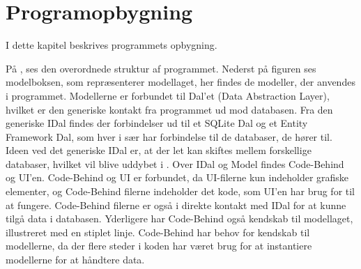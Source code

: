 \chapter{Programopbygning}

I dette kapitel beskrives programmets opbygning. 



På , ses den overordnede struktur af programmet.
Nederst på figuren ses modelboksen, som repræsenterer modellaget, her findes de modeller, der anvendes i programmet.
Modellerne er forbundet til Dal'et (Data Abstraction Layer), hvilket er den generiske kontakt fra programmet ud mod databasen. 	
Fra den generiske IDal findes der forbindelser ud til et SQLite Dal og et Entity Framework Dal, som hver i sær har forbindelse til de databaser, de hører til. 
Ideen ved det generiske IDal er, at der let kan skiftes mellem forskellige databaser, hvilket vil blive uddybet i .
Over IDal og Model findes Code-Behind og UI'en.  
Code-Behind og UI er forbundet, da UI-filerne kun indeholder grafiske elementer, og Code-Behind filerne indeholder det kode, som UI'en har brug for til at fungere.
Code-Behind filerne er også i direkte kontakt med IDal  for at kunne tilgå data i databasen.
Yderligere har Code-Behind også kendskab til modellaget, illustreret med en stiplet linje.
Code-Behind har behov for kendskab til modellerne, da der flere steder i koden har været brug for at instantiere modellerne for at håndtere data. 